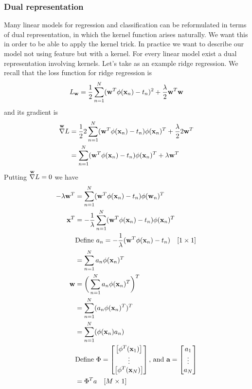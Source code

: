\documentclass[main.tex]{subfiles}
\begin{document}
\subsubsection{Dual representation}
Many linear models for regression and classification can be reformulated in terms of dual representation, in which the kernel function arises naturally. We want this in order to be able to apply the kernel trick. In practice we want to describe our model not using feature but with a kernel. For every linear model exist a dual representation involving kernels. Let's take as an example ridge regression.
We recall that the loss function for ridge regression is
\begin{equation*}
    L_{\textbf{w}} = \frac{1}{2}\sum_{n=1}^N (\textbf{w}^T\phi(\textbf{x}_n) - t_n)^2 + \frac{\lambda}{2}\textbf{w}^T \textbf{w}
\end{equation*}
and its gradient is
\begin{align*}
    \overset{\textbf{w}}{\nabla}L &= \frac{1}{2} 2 \sum_{n=1}^N (\textbf{w}^T\phi(\textbf{x}_n) - t_n) \phi(\textbf{x}_n)^T + \frac{\lambda}{2}2 \textbf{w}^T \\
    &= \sum_{n=1}^N (\textbf{w}^T\phi(\textbf{x}_n) - t_n) \phi(\textbf{x}_n)^T + \lambda \textbf{w}^T
\end{align*}
Putting $\overset{\textbf{w}}{\nabla}L = 0$ we have
\begin{align*}
    -\lambda \textbf{w}^T &= \sum_{n=1}^N (\textbf{w}^T\phi(\textbf{x}_n) - t_n) \phi(\textbf{w}_n)^T \\
    \textbf{x}^T &= -\frac{1}{\lambda} \sum_{n=1}^N (\textbf{w}^T\phi(\textbf{x}_n) - t_n) \phi(\textbf{x}_n)^T \\
    & \text{Define } a_n = -\frac{1}{\lambda} (\textbf{w}^T\phi(\textbf{x}_n) - t_n) \quad [1 \times 1]\\
    &= \sum_{n=1}^N a_n \phi(\textbf{x}_n)^T \\
    \textbf{w} &= \bigg( \sum_{n=1}^N a_n \phi(\textbf{x}_n)^T \bigg)^T \\
    &= \sum_{n=1}^N (a_n \phi(\textbf{x}_n)^T)^T \\
    &= \sum_{n=1}^N (\phi(\textbf{x}_n) a_n) \\
    & \text{Define } \Phi = \begin{bmatrix}\begin{bmatrix}\phi^T(\textbf{x}_1)\end{bmatrix}\\ \vdots \\ \begin{bmatrix} \phi^T(\textbf{x}_N)\end{bmatrix}\end{bmatrix} \text{, and } \textbf{a}=\begin{bmatrix}a_1 \\ \vdots \\ a_N\end{bmatrix}\\
    &= \Phi^T a \quad [M \times 1]
\end{align*}
\end{document}
